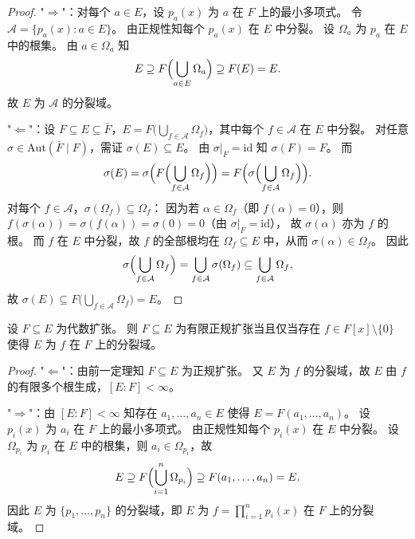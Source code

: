 \documentclass[lang=cn,a4paper,newtx]{elegantbook}
\begin{document}
\begin{proof}
  "$\Rightarrow$"：对每个 $a\in E$，设 $p_a(x)$ 为 $a$ 在 $F$ 上的最小多项式。
  令 $\mathcal{A}=\{p_a(x):a\in E\}$。
  由正规性知每个 $p_a(x)$ 在 $E$ 中分裂。
  设 $\Omega_a$ 为 $p_a$ 在 $E$ 中的根集。
  由 $a\in\Omega_a$ 知
  \[
    E\supseteq F\Bigl(\bigcup_{a\in E}\Omega_a\Bigr)\supseteq F(E)=E.
  \]
  故 $E$ 为 $\mathcal{A}$ 的分裂域。

  "$\Leftarrow$"：设 $F\subseteq E\subseteq\bar F$，$E=F\bigl(\bigcup_{f\in\mathcal{A}}\Omega_f\bigr)$，其中每个 $f\in\mathcal{A}$ 在 $E$ 中分裂。
  对任意 $\sigma\in\mathrm{Aut}(\bar F\mid F)$，需证 $\sigma(E)\subseteq E$。
  由 $\sigma\big|_F=\mathrm{id}$ 知 $\sigma(F)=F$。
  而
  \[
    \sigma(E)=\sigma\Bigl(F\Bigl(\bigcup_{f\in\mathcal{A}}\Omega_f\Bigr)\Bigr)=F\Bigl(\sigma\Bigl(\bigcup_{f\in\mathcal{A}}\Omega_f\Bigr)\Bigr).
  \]
  对每个 $f\in\mathcal{A}$，$\sigma(\Omega_f)\subseteq\Omega_f$：
  因为若 $\alpha\in\Omega_f$（即 $f(\alpha)=0$），则 $f(\sigma(\alpha))=\sigma(f(\alpha))=\sigma(0)=0$（由 $\sigma\big|_F=\mathrm{id}$），
  故 $\sigma(\alpha)$ 亦为 $f$ 的根。
  而 $f$ 在 $E$ 中分裂，故 $f$ 的全部根均在 $\Omega_f\subseteq E$ 中，从而 $\sigma(\alpha)\in\Omega_f$。
  因此
  \[
    \sigma\Bigl(\bigcup_{f\in\mathcal{A}}\Omega_f\Bigr)=\bigcup_{f\in\mathcal{A}}\sigma(\Omega_f)\subseteq\bigcup_{f\in\mathcal{A}}\Omega_f,
  \]
  故 $\sigma(E)\subseteq F\bigl(\bigcup_{f\in\mathcal{A}}\Omega_f\bigr)=E$。
\end{proof}

\begin{theorem}
  设 $F\subseteq E$ 为代数扩张。
  则 $F\subseteq E$ 为有限正规扩张当且仅当存在 $f\in F[x]\setminus\{0\}$ 使得 $E$ 为 $f$ 在 $F$ 上的分裂域。
\end{theorem}

\begin{proof}
  "$\Leftarrow$"：由前一定理知 $F\subseteq E$ 为正规扩张。
  又 $E$ 为 $f$ 的分裂域，故 $E$ 由 $f$ 的有限多个根生成，$[E:F]<\infty$。

  "$\Rightarrow$"：由 $[E:F]<\infty$ 知存在 $a_1,\dots,a_n\in E$ 使得 $E=F(a_1,\dots,a_n)$。
  设 $p_i(x)$ 为 $a_i$ 在 $F$ 上的最小多项式。
  由正规性知每个 $p_i(x)$ 在 $E$ 中分裂。
  设 $\Omega_{p_i}$ 为 $p_i$ 在 $E$ 中的根集，则 $a_i\in\Omega_{p_i}$，故
  \[
    E\supseteq F\Bigl(\bigcup_{i=1}^{n}\Omega_{p_i}\Bigr)\supseteq F(a_1,\dots,a_n)=E.
  \]
  因此 $E$ 为 $\{p_1,\dots,p_n\}$ 的分裂域，即 $E$ 为 $f=\prod_{i=1}^{n}p_i(x)$ 在 $F$ 上的分裂域。
\end{proof}
\end{document}
